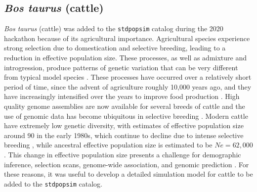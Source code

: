 \documentclass[hidelinks]{article}
\newcommand{\stdpopsim}{\texttt{stdpopsim}\xspace}
\begin{document}
\hypertarget{bos-taurus}{%
	\subsection*{\texorpdfstring{\emph{Bos
				taurus} (cattle)}{Bos taurus (cattle)}}\label{bos-taurus}}

\emph{Bos taurus} (cattle) was added to the \stdpopsim catalog during the 2020 hackathon because of its agricultural importance. Agricultural species experience
strong selection due to domestication and selective breeding, leading
to a reduction in effective population size. These processes,
as well as admixture and introgression, produce patterns
of genetic variation that can be very different from typical model
species \citep{Larson2013}. These processes have occurred over a
relatively short period of time, since the advent of agriculture roughly 10,000 years ago, and they have increasingly intensified over the years to improve food production \citep{Gaut2018,MacLeod2013}. High quality genome assemblies are now
available for several breeds of cattle \citep[e.g.,][]{Rosen2020, Heaton2021,
Talenti2022} and the use of genomic data has become ubiquitous
in selective breeding \citep{Meuwissen2001,
MacLeod2014, Obsteter2021, Cesarani2022}. Modern cattle have extremely low genetic diversity,
with estimates of effective population size around 90 in the early 1980s, which continue to decline due to intense selective breeding \citep{MacLeod2013, VanRaden2020, Makanjouloa2020}, while ancestral effective population size is estimated to be $Ne=62,000$ \citep{MacLeod2013}. This change in effective population size presents a challenge for demographic inference, selection scans, genome-wide association, and genomic prediction
\citep{MacLeod2013,MacLeod2014,Hartfield2022}. For these reasons, it was useful to develop a detailed simulation model for cattle to be added to the \stdpopsim catalog.
\end{document}
